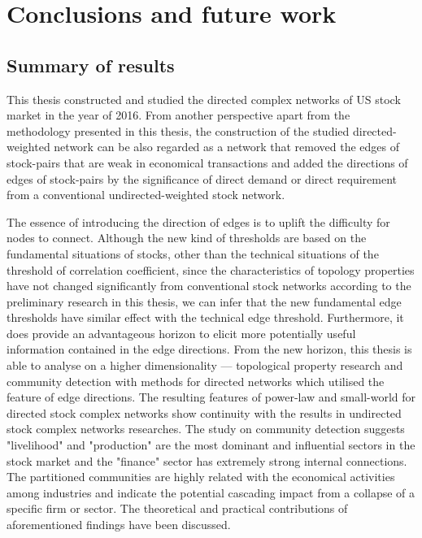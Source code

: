 \chapter[Conclusions]{Conclusions and future work}
\label{cpt:conclude}
\section{Summary of results}

This thesis constructed and studied the directed complex networks of US stock market in the year of 2016. From another perspective apart from the methodology presented in this thesis, the construction of the studied directed-weighted network can be also regarded as a network that removed the edges of stock-pairs that are weak in economical transactions and added the directions of edges of stock-pairs by the significance of direct demand or direct requirement from a conventional undirected-weighted stock network.

The essence of introducing the direction of edges is to uplift the difficulty for nodes to connect. Although the new kind of thresholds are based on the fundamental situations of stocks, other than the technical situations of the threshold of correlation coefficient, since the characteristics of topology properties have not changed significantly from conventional stock networks according to the preliminary research in this thesis, we can infer that the new fundamental edge thresholds have similar effect with the technical edge threshold. Furthermore, it does provide an advantageous horizon to elicit more potentially useful information contained in the edge directions. From the new horizon, this thesis is able to analyse on a higher dimensionality — topological property research and community detection with methods for directed networks which utilised the feature of edge directions. The resulting features of power-law and small-world for directed stock complex networks show continuity with the results in undirected stock complex networks researches. The study on community detection suggests "livelihood" and "production" are the most dominant and influential sectors in the stock market and the "finance" sector has extremely strong internal connections. The partitioned communities are highly related with the economical activities among industries and indicate the potential cascading impact from a collapse of a specific firm or sector. The theoretical and practical contributions of aforementioned findings have been discussed.

